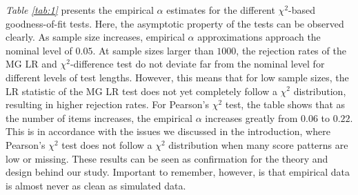 \documentclass[Royal,sageapa,times,doublespace]{sagej}
\begin{document}
\indent \textit{Table \ref{tab:1}} presents the empirical $\alpha$ estimates for the different $\chi^2$-based goodness-of-fit tests. Here, the asymptotic property of the tests can be observed clearly. As sample size increases, empirical $\alpha$ approximations approach the nominal level of $0.05$. At sample sizes larger than $1000$, the rejection rates of the MG LR and $\chi^2$-difference test do not deviate far from the nominal level for different levels of test lengths. However, this means that for low sample sizes, the LR statistic of the MG LR test does not yet completely follow a $\chi^2$ distribution, resulting in higher rejection rates. For Pearson's $\chi^2$ test, the table shows that as the number of items increases, the empirical $\alpha$ increases greatly from $0.06$ to $0.22$. This is in accordance with the issues we discussed in the introduction, where Pearson's $\chi^2$ test does not follow a $\chi^2$ distribution when many score patterns are low or missing. These results can be seen as confirmation for the theory and design behind our study. Important to remember, however, is that empirical data is almost never as clean as simulated data. \\
\end{document}
